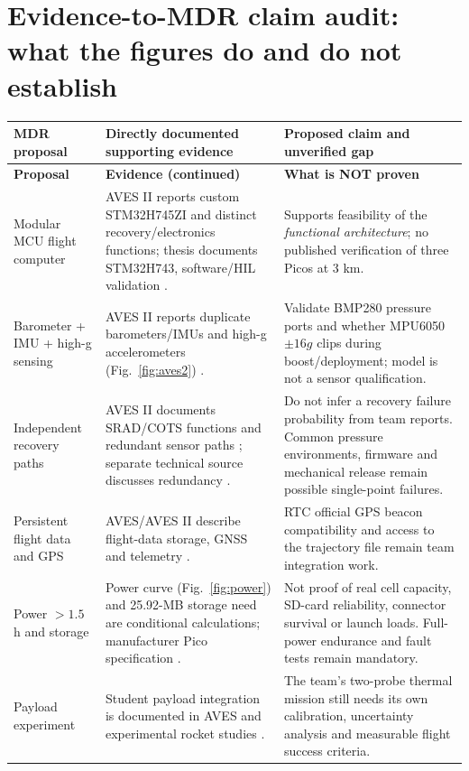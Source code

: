 \documentclass[10pt,a4paper]{article}
\begin{document}
\section{Evidence-to-MDR claim audit: what the figures do and do not establish}
\small
\begin{longtable}{@{}L{31mm}L{57mm}L{55mm}@{}}
\toprule{}\textbf{MDR proposal} & \textbf{Directly documented supporting evidence} & \textbf{Proposed claim and unverified gap}\\\midrule\endfirsthead
\toprule{}\textbf{Proposal} & \textbf{Evidence (continued)} & \textbf{What is NOT proven}\\\midrule\endhead
\bottomrule\endlastfoot
Modular MCU flight computer & AVES II reports custom STM32H745ZI and distinct recovery/electronics functions; thesis documents STM32H743, software/HIL validation \cite{astg2022aves2,zlamala2024}. & Supports feasibility of the \emph{functional architecture}; no published verification of three Picos at 3 km.\\
Barometer + IMU + high-g sensing & AVES II reports duplicate barometers/IMUs and high-g accelerometers (Fig.~\ref{fig:aves2}) \cite{astg2022aves2}. & Validate BMP280 pressure ports and whether MPU6050 $\pm16g$ clips during boost/deployment; model is not a sensor qualification.\\
Independent recovery paths & AVES II documents SRAD/COTS functions and redundant sensor paths \cite{astg2022aves2}; separate technical source discusses redundancy \cite{kahe2017}. & Do not infer a recovery failure probability from team reports. Common pressure environments, firmware and mechanical release remain possible single-point failures.\\
Persistent flight data and GPS & AVES/AVES II describe flight-data storage, GNSS and telemetry \cite{astg2021aves,astg2022aves2}. & RTC official GPS beacon compatibility and access to the trajectory file remain team integration work.\\
Power $>1.5$ h and storage & Power curve (Fig.~\ref{fig:power}) and 25.92-MB storage need are conditional calculations; manufacturer Pico specification \cite{rpicopico}. & Not proof of real cell capacity, SD-card reliability, connector survival or launch loads. Full-power endurance and fault tests remain mandatory.\\
Payload experiment & Student payload integration is documented in AVES and experimental rocket studies \cite{astg2021aves,bakirci2022}. & The team's two-probe thermal mission still needs its own calibration, uncertainty analysis and measurable flight success criteria.\\
\end{longtable}
\normalsize
\end{document}
